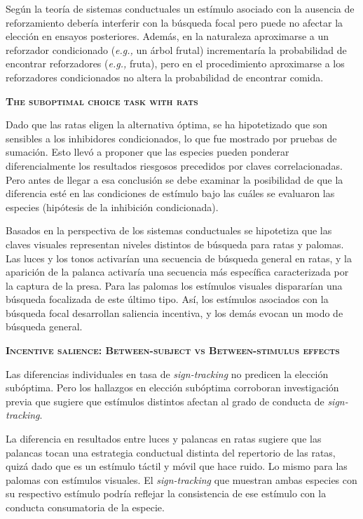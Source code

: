 \documentclass[a4paper,12pt]{article}
\begin{document}
Según la teoría de sistemas conductuales un estímulo asociado con la ausencia de reforzamiento debería interferir con la búsqueda focal pero puede no afectar la elección en ensayos posteriores.
Además, en la naturaleza aproximarse a un reforzador condicionado ({\itshape e.g.,} un árbol frutal) incrementaría la probabilidad de encontrar reforzadores ({\itshape e.g.,} fruta), pero en el procedimiento aproximarse a los reforzadores condicionados no altera la probabilidad de encontrar comida.

{\scshape\bfseries The suboptimal choice task with rats}

Dado que las ratas eligen la alternativa óptima, se ha hipotetizado que son sensibles a los inhibidores condicionados, lo que fue mostrado por pruebas de sumación.
Esto llevó a proponer que las especies pueden ponderar diferencialmente los resultados riesgosos precedidos por claves correlacionadas.
Pero antes de llegar a esa conclusión se debe examinar la posibilidad de que la diferencia esté en las condiciones de estímulo bajo las cuáles se evaluaron las especies (hipótesis de la inhibición condicionada).

Basados en la perspectiva de los sistemas conductuales se hipotetiza que las claves visuales representan niveles distintos de búsqueda para ratas y palomas.
Las luces y los tonos activarían una secuencia de búsqueda general en ratas, y la aparición de la palanca activaría una secuencia más específica caracterizada por la captura de la presa.
Para las palomas los estímulos visuales dispararían una búsqueda focalizada de este último tipo.
Así, los estímulos asociados con la búsqueda focal desarrollan saliencia incentiva, y los demás evocan un modo de búsqueda general.

{\scshape\bfseries Incentive salience: Between-subject vs Between-stimulus effects}

Las diferencias individuales en tasa de {\itshape sign-tracking} no predicen la elección subóptima.
Pero los hallazgos en elección subóptima corroboran investigación previa que sugiere que estímulos distintos afectan al grado de conducta de {\itshape sign-tracking}.

La diferencia en resultados entre luces y palancas en ratas sugiere que las palancas tocan una estrategia conductual distinta del repertorio de las ratas, quizá dado que es un estímulo táctil y móvil que hace ruido.
Lo mismo para las palomas con estímulos visuales.
El {\itshape sign-tracking} que muestran ambas especies con su respectivo estímulo podría reflejar la consistencia de ese estímulo con la conducta consumatoria de la especie.
\end{document}
